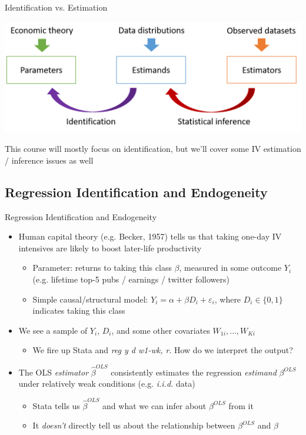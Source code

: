 \documentclass{beamer}
\begin{document}
\begin{frame}{Identification vs. Estimation}
\smallskip

\includegraphics[scale=0.37]{./lecture_includes/BigPicture.png}
\medskip

This course will mostly focus on identification, but we'll cover some IV estimation / inference issues as well
\end{frame}

\subsection{Regression Identification and Endogeneity}
\begin{frame}{Regression Identification and Endogeneity}
\begin{itemize}
\item Human capital theory (e.g. Becker, 1957) tells us that taking one-day IV intensives are likely to boost later-life productivity\pause{}\smallskip
\begin{itemize}
\item Parameter: returns to taking this class $\beta$, measured in some outcome $Y_i$ (e.g. lifetime top-5 pubs / earnings / twitter followers)\smallskip
\item Simple causal/structural model: $Y_i=\alpha+\beta D_i + \varepsilon_i$, where $D_i\in\{0,1\}$ indicates taking this class
\end{itemize}\pause\smallskip
\item We see a sample of $Y_i$, $D_i$, and some other covariates $W_{1i},\dots,W_{Ki}$\smallskip
\begin{itemize}
\item We fire up Stata and \emph{reg y d w1-wk, r}. How do we interpret the output?
\end{itemize}\pause{}\medskip
\item The OLS \emph{estimator} $\widehat{\beta}^{OLS}$ consistently estimates the regression \emph{estimand} $\beta^{OLS}$ under relatively weak conditions (e.g. \emph{i.i.d.} data)\smallskip
\begin{itemize}
\item Stata tells us $\widehat{\beta}^{OLS}$ and what we can infer about $\beta^{OLS}$ from it\smallskip
\item It \emph{doesn't} directly tell us about the relationship between $\beta^{OLS}$ and $\beta$
\end{itemize}
\end{itemize}
\end{frame}
\end{document}
